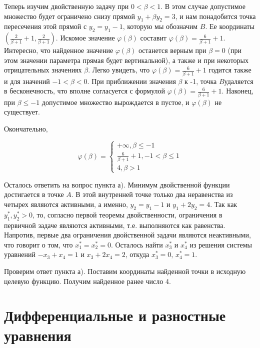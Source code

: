 \begin{solution}
Теперь изучим двойственную задачу при $0<\beta <1$. В этом случае допустимое множество будет ограничено снизу прямой $y_{1} +\beta y_{2} =3$, и нам понадобится точка пересечения этой прямой с $y_{2} =y_{1} -1$, которую мы обозначим $B$. Ее координаты $\left(\frac{2}{\beta +1} +1,\frac{2}{\beta +1} \right)$. Искомое значение $\varphi (\beta )$ составит $\varphi (\beta )=\frac{6}{\beta +1} +1$. Интересно, что найденное значение $\varphi (\beta )$ останется верным при $\beta =0$ (при этом значении параметра прямая будет вертикальной), а также и при некоторых отрицательных значениях $\beta $. Легко увидеть, что $\varphi (\beta )=\frac{6}{\beta +1} +1$ годится также и для значений $-1<\beta <0$. При приближении значения $\beta $ к -1, точка $B$удаляется в бесконечность, что вполне согласуется с формулой $\varphi (\beta )=\frac{6}{\beta +1} +1$. Наконец, при $\beta \le -1$ допустимое множество вырождается в пустое, и $\varphi (\beta )$ не существует.

Окончательно,  

\[\varphi (\beta )=\left\{\begin{array}{l} {+\infty , \beta \le -1} \\ {\frac{6}{\beta +1} +1, -1<\beta \le 1} \\ {4, \beta >1} \end{array}\right. \] 

Осталось ответить на вопрос пункта а). Минимум двойственной функции достигается в точке $A$. В этой внутренней точке только два неравенства из четырех являются активными, а именно, $y_{2} =y_{1} -1$ и $y_{1} +2y_{2} =4$. Так как $y_{1}^{*} , y_{2}^{*} >0$, то, согласно первой теоремы двойственности, ограничения в первичной задаче являются активными, т.е. выполняются как равенства. Напротив, первые два ограничения двойственной задачи являются неактивными, что говорит о том, что $x_{1}^{*} =x_{2}^{*} =0$. Осталось найти $x_{3}^{*} $ и $x_{4}^{*} $ из решения системы уравнений $-x_{3} +x_{4} =1$ и $x_{3} +2x_{4} =2$, откуда $x_{3}^{*} =0$, $x_{4}^{*} =1$.

Проверим ответ пункта а). Поставим координаты найденной точки в исходную целевую функцию. Получим найденное ранее число 4.
\end{solution}




\section{Дифференциальные и разностные уравнения}

